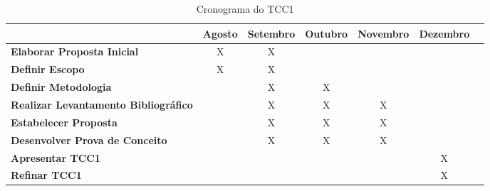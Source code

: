 \begin{table}[h]
\centering
\caption{Cronograma do TCC1}
\label{cronograma tcc1}
\begin{adjustbox}{width=\textwidth}
\begin{tabular}{|l|c|c|c|c|c|c|}
\hline
                                                & \multicolumn{1}{l|}{\textbf{Agosto}} & \multicolumn{1}{l|}{\textbf{Setembro}} & \multicolumn{1}{l|}{\textbf{Outubro}} & \multicolumn{1}{l|}{\textbf{Novembro}} & \multicolumn{1}{l|}{\textbf{Dezembro}} \\ \hline
\textbf{Elaborar Proposta Inicial}              & X                                    & X                                      &                                       &                                        &                                        \\ \hline
\textbf{Definir Escopo}                         & X                                    & X                                      &                                       &                                        &                                        \\ \hline
\textbf{Definir Metodologia}                    &                                      & X                                      & X                                     &                                        &                                        \\ \hline
\textbf{Realizar Levantamento Bibliográfico}    &                                      & X                                      & X                                     & X                                      &                                        \\ \hline
\textbf{Estabelecer Proposta}                   &                                      & X                                      & X                                     & X                                      &                                        \\ \hline
\textbf{Desenvolver Prova de Conceito}          &                                      & X                                      & X                                     & X                                      &                                        \\ \hline
\textbf{Apresentar TCC1}                        &                                      &                                        &                                       &                                        & X                                      \\ \hline
\textbf{Refinar TCC1}                           &                                      &                                        &                                       &                                        & X                                      \\ \hline
\end{tabular}
\end{adjustbox}
\end{table}

